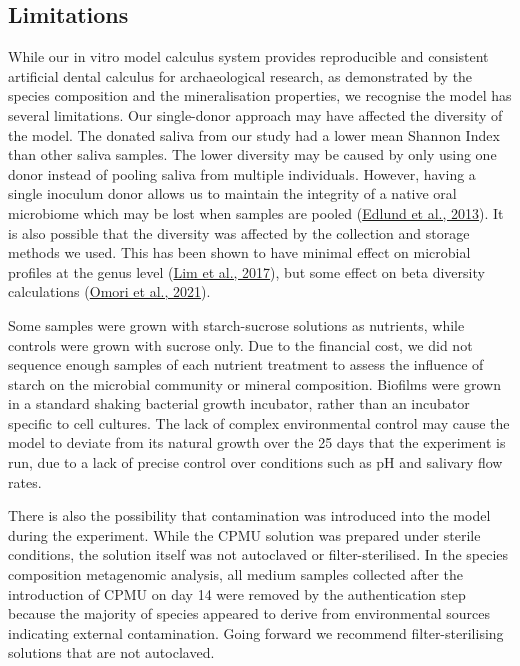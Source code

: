 \documentclass[
  b5paper,
]{book}
\begin{document}
\hypertarget{limitations}{%
\subsection{Limitations}\label{limitations}}

While our in vitro model calculus system provides reproducible and
consistent artificial dental calculus for archaeological research, as
demonstrated by the species composition and the mineralisation
properties, we recognise the model has several limitations. Our
single-donor approach may have affected the diversity of the model. The
donated saliva from our study had a lower mean Shannon Index than other
saliva samples. The lower diversity may be caused by only using one
donor instead of pooling saliva from multiple individuals. However,
having a single inoculum donor allows us to maintain the integrity of a
native oral microbiome which may be lost when samples are pooled
(\protect\hyperlink{ref-edlundBiofilmModel2013}{Edlund et al., 2013}).
It is also possible that the diversity was affected by the collection
and storage methods we used. This has been shown to have minimal effect
on microbial profiles at the genus level
(\protect\hyperlink{ref-limSalivaMicrobiome2017}{Lim et al., 2017}), but
some effect on beta diversity calculations
(\protect\hyperlink{ref-omoriComparativeEvaluation2021}{Omori et al.,
2021}).

Some samples were grown with starch-sucrose solutions as nutrients,
while controls were grown with sucrose only. Due to the financial cost,
we did not sequence enough samples of each nutrient treatment to assess
the influence of starch on the microbial community or mineral
composition. Biofilms were grown in a standard shaking bacterial growth
incubator, rather than an incubator specific to cell cultures. The lack
of complex environmental control may cause the model to deviate from its
natural growth over the 25 days that the experiment is run, due to a
lack of precise control over conditions such as pH and salivary flow
rates.

There is also the possibility that contamination was introduced into the
model during the experiment. While the CPMU solution was prepared under
sterile conditions, the solution itself was not autoclaved or
filter-sterilised. In the species composition metagenomic analysis, all
medium samples collected after the introduction of CPMU on day 14 were
removed by the authentication step because the majority of species
appeared to derive from environmental sources indicating external
contamination. Going forward we recommend filter-sterilising solutions
that are not autoclaved.
\end{document}
